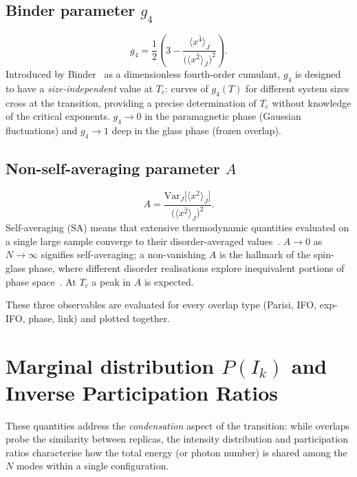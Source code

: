 \documentclass[11pt,a4paper]{article}
\newcommand{\avg}[1]{\langle #1 \rangle}
\newcommand{\avgJ}[1]{\overline{#1}}
\begin{document}
\subsection{Binder parameter $g_4$}
\begin{equation}\label{eq:binder}
  g_4 = \frac{1}{2}\!\left(3 - \frac{\avgJ{\avg{x^4}_J}}
                                     {\bigl(\avgJ{\avg{x^2}_J}\bigr)^2}\right).
\end{equation}
Introduced by Binder~\cite{Binder1981} as a dimensionless
fourth-order cumulant, $g_4$ is designed to have a
\emph{size-independent} value at $T_c$:
curves of $g_4(T)$ for different system sizes cross at the
transition, providing a precise determination of $T_c$ without
knowledge of the critical exponents.
$g_4 \to 0$ in the paramagnetic phase (Gaussian fluctuations) and
$g_4 \to 1$ deep in the glass phase (frozen overlap).

\subsection{Non-self-averaging parameter $A$}
\begin{equation}\label{eq:A}
  A = \frac{\mathrm{Var}_J\!\bigl[\avg{x^2}_J\bigr]}
           {\bigl(\avgJ{\avg{x^2}_J}\bigr)^2}.
\end{equation}
Self-averaging (SA) means that extensive thermodynamic
quantities evaluated on a single large sample converge to
their disorder-averaged
values~\cite{Wiseman1995,AharonyHarris1996}.
$A \to 0$ as $N\to\infty$ signifies self-averaging;
a non-vanishing $A$ is the hallmark of the spin-glass
phase, where different disorder realisations explore inequivalent
portions of phase space~\cite{MPV1987}.
At $T_c$ a peak in $A$ is expected.

These three observables are evaluated for every overlap type
(Parisi, IFO, exp-IFO, phase, link) and plotted together.

\section{Marginal distribution $P(I_k)$ and Inverse Participation Ratios}

These quantities address the \emph{condensation} aspect of the
transition: while overlaps probe the similarity between replicas,
the intensity distribution and participation ratios characterise
how the total energy (or photon number) is shared among the $N$
modes within a single configuration.
\end{document}
